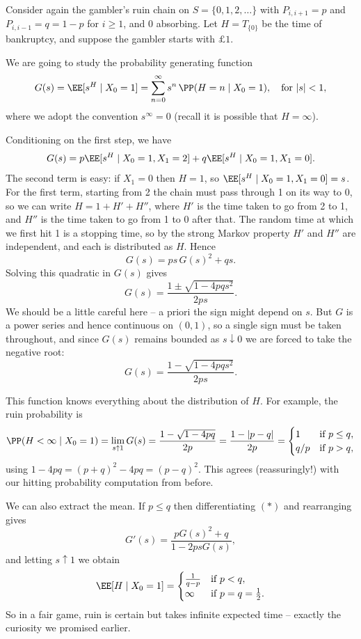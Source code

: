 \documentclass[a4paper]{scrartcl}
\begin{document}
\begin{example}
	Consider again the gambler's ruin chain on $S = \{0, 1, 2, \dots\}$ with $P_{i, i + 1} = p$ and $P_{i, i - 1} = q = 1 - p$ for $i \geq 1$, and $0$ absorbing. Let $H = T_{\{0\}}$ be the time of bankruptcy, and suppose the gambler starts with $\pounds 1$.

	We are going to study the probability generating function
	$$
	G(s) = \EE[s^H \mid X_0 = 1] = \sum_{n = 0}^{\infty} s^n \, \PP(H = n \mid X_0 = 1), \quad \text{for } |s| < 1,
	$$
	where we adopt the convention $s^{\infty} = 0$ (recall it is possible that $H = \infty$).

	Conditioning on the first step, we have
	$$
	G(s) = p\EE[s^H \mid X_0 = 1, X_1 = 2] + q\EE[s^H \mid X_0 = 1, X_1 = 0].
	$$
	The second term is easy: if $X_1 = 0$ then $H = 1$, so $\EE[s^H \mid X_0 = 1, X_1 = 0] = s$. For the first term, starting from 2 the chain must pass through 1 on its way to 0, so we can write $H = 1 + H' + H''$, where $H'$ is the time taken to go from 2 to 1, and $H''$ is the time taken to go from 1 to 0 after that. The random time at which we first hit 1 is a stopping time, so by the strong Markov property $H'$ and $H''$ are independent, and each is distributed as $H$. Hence
	\begin{equation}
	G(s) = ps\, G(s)^2 + qs. \tag{$*$}
	\end{equation}
	Solving this quadratic in $G(s)$ gives
	$$
	G(s) = \frac{1 \pm \sqrt{1 - 4pqs^2}}{2ps}.
	$$
	We should be a little careful here -- a priori the sign might depend on $s$. But $G$ is a power series and hence continuous on $(0, 1)$, so a single sign must be taken throughout, and since $G(s)$ remains bounded as $s \downarrow 0$ we are forced to take the negative root:
	$$
	G(s) = \frac{1 - \sqrt{1 - 4pqs^2}}{2ps}.
	$$

	This function knows everything about the distribution of $H$. For example, the ruin probability is
	$$
	\PP(H < \infty \mid X_0 = 1) = \lim_{s \uparrow 1} G(s) = \frac{1 - \sqrt{1 - 4pq}}{2p} = \frac{1 - |p - q|}{2p} = \begin{cases}
		1 &\mbox{if } p \leq q, \\
		q/p &\mbox{if } p > q,
	   \end{cases}
	$$
	using $1 - 4pq = (p + q)^2 - 4pq = (p - q)^2$. This agrees (reassuringly!) with our hitting probability computation from before.

	We can also extract the mean. If $p \leq q$ then differentiating $(*)$ and rearranging gives
	$$
	G'(s) = \frac{pG(s)^2 + q}{1 - 2psG(s)},
	$$
	and letting $s \uparrow 1$ we obtain
	$$
	\EE[H \mid X_0 = 1] = \begin{cases}
		\frac{1}{q - p} &\mbox{if } p < q, \\
		\infty &\mbox{if } p = q = \frac{1}{2}.
	   \end{cases}
	$$
	So in a fair game, ruin is certain but takes infinite expected time -- exactly the curiosity we promised earlier.
\end{example}
\end{document}
